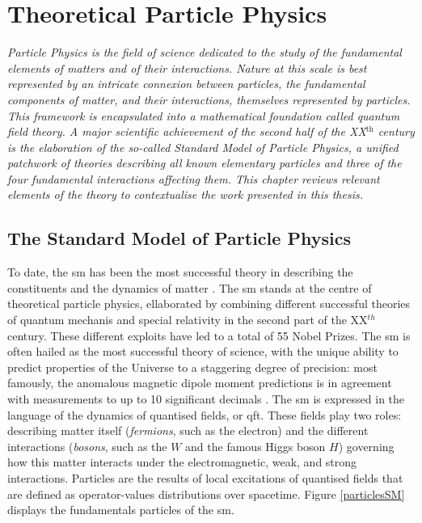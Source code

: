 \chapter{\color{oxfordblue} Theoretical Particle Physics}\label{chap-theory}
\textit{Particle Physics is the field of science dedicated to the study of the fundamental elements of matters and of their interactions. Nature at this scale is best represented by an intricate connexion between particles, the fundamental components of matter, and their interactions, themselves represented by particles. This framework is encapsulated into a mathematical foundation called quantum field theory. A major scientific achievement of the second half of the XX$^{\text{th}}$ century is the elaboration of the so-called Standard Model of Particle Physics, a unified patchwork of theories describing all known elementary particles and three of the four fundamental interactions affecting them. This chapter reviews relevant elements of the theory to contextualise the work presented in this thesis.}

\section{The Standard Model of Particle Physics}\label{Section:SM}
To date, the \gls{sm} has been the most successful theory in describing the constituents and the dynamics of matter \cite{SMphysics}. The \gls{sm} stands at the centre of theoretical particle physics, ellaborated by combining different successful theories of quantum mechanis and special relativity in the second part of the XX$^{th}$ century. These different exploits have led to a total of 55 Nobel Prizes. The \gls{sm} is often hailed as the most successful theory of science, with the unique ability to predict properties of the Universe to a staggering degree of precision: most famously, the anomalous magnetic dipole moment predictions is in agreement with measurements to up to 10 significant decimals \cite{PhysRevA.83.052122}. The \gls{sm} is expressed in the language of the dynamics of quantised fields, or \gls{qft}. These fields play two roles: describing matter itself (\textit{fermions}, such as the electron) and the different interactions (\textit{bosons}, such as the $W$ and the famous Higgs boson $H$) governing how this matter interacts under the electromagnetic, weak, and strong interactions. Particles are the results of local excitations of quantised fields that are defined as operator-values distributions over spacetime. Figure \ref{particlesSM} displays the fundamentals particles of the \gls{sm}. \\

